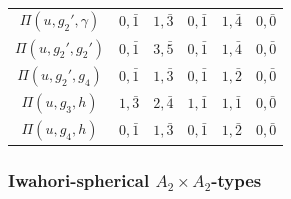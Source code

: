 \begin{landscape}
\begin{table}[h]
\begin{minipage}{0.4\textwidth}
\begin{tabular}{|c|ccccc|}
                $\Pi(u,g_2',\gamma)$ & $0,\bar1$ & $1,\bar{3}$ & $0,\bar1$ & $1,\bar4$ & $0,\bar0$ \\
                $\Pi(u,g_2',g_2')$ & $0,\bar1$ & $3,\bar{5}$ & $0,\bar1$ & $1,\bar4$ & $0,\bar0$ \\
                $\Pi(u,g_2',g_4)$ & $0,\bar1$ & $1,\bar{3}$ & $0,\bar1$ & $1,\bar2$ & $0,\bar0$ \\\hline
                $\Pi(u,g_3,h)$ & $1,\bar{3}$ & $2,\bar{4}$ & $1,\bar1$ & $1,\bar1$ & $0,\bar0$ \\\hline
                $\Pi(u,g_4,h)$ & $0,\bar1$ & $1,\bar{3}$ & $0,\bar1$ & $1,\bar2$ & $0,\bar0$ \\\hline
            \end{tabular}
            \caption{}
        \end{minipage}
    \end{table}
    \newpage
    \centering
    \subsubsection*{Iwahori-spherical \texorpdfstring{$A_2\times A_2$}{PDFstring}-types}

    \begin{table}[!ht]
        \centering
        

\end{table}
\end{landscape}

